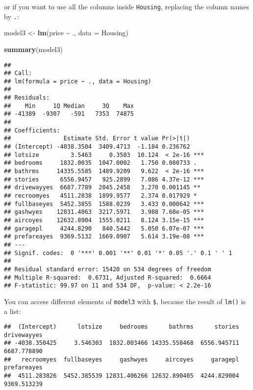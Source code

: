\documentclass[
]{article}
\newenvironment{Shaded}{\begin{snugshade}}{\end{snugshade}}
\newcommand{\DataTypeTok}[1]{\textcolor[rgb]{0.13,0.29,0.53}{#1}}
\newcommand{\KeywordTok}[1]{\textcolor[rgb]{0.13,0.29,0.53}{\textbf{#1}}}
\newcommand{\NormalTok}[1]{#1}
\newcommand{\OperatorTok}[1]{\textcolor[rgb]{0.81,0.36,0.00}{\textbf{#1}}}
\newcommand{\StringTok}[1]{\textcolor[rgb]{0.31,0.60,0.02}{#1}}
\begin{document}
or if you want to use all the columns inside \texttt{Housing}, replacing the column names by \texttt{.}:

\begin{Shaded}
\begin{Highlighting}[]
\NormalTok{model3 \textless{}{-}}\StringTok{ }\KeywordTok{lm}\NormalTok{(price }\OperatorTok{\textasciitilde{}}\StringTok{ }\NormalTok{., }\DataTypeTok{data =}\NormalTok{ Housing)}

\KeywordTok{summary}\NormalTok{(model3)}
\end{Highlighting}
\end{Shaded}

\begin{verbatim}
## 
## Call:
## lm(formula = price ~ ., data = Housing)
## 
## Residuals:
##    Min     1Q Median     3Q    Max 
## -41389  -9307   -591   7353  74875 
## 
## Coefficients:
##               Estimate Std. Error t value Pr(>|t|)    
## (Intercept) -4038.3504  3409.4713  -1.184 0.236762    
## lotsize         3.5463     0.3503  10.124  < 2e-16 ***
## bedrooms     1832.0035  1047.0002   1.750 0.080733 .  
## bathrms     14335.5585  1489.9209   9.622  < 2e-16 ***
## stories      6556.9457   925.2899   7.086 4.37e-12 ***
## drivewayyes  6687.7789  2045.2458   3.270 0.001145 ** 
## recroomyes   4511.2838  1899.9577   2.374 0.017929 *  
## fullbaseyes  5452.3855  1588.0239   3.433 0.000642 ***
## gashwyes    12831.4063  3217.5971   3.988 7.60e-05 ***
## aircoyes    12632.8904  1555.0211   8.124 3.15e-15 ***
## garagepl     4244.8290   840.5442   5.050 6.07e-07 ***
## prefareayes  9369.5132  1669.0907   5.614 3.19e-08 ***
## ---
## Signif. codes:  0 '***' 0.001 '**' 0.01 '*' 0.05 '.' 0.1 ' ' 1
## 
## Residual standard error: 15420 on 534 degrees of freedom
## Multiple R-squared:  0.6731, Adjusted R-squared:  0.6664 
## F-statistic: 99.97 on 11 and 534 DF,  p-value: < 2.2e-16
\end{verbatim}

You can access different elements of \texttt{model3} with \texttt{\$}, because the result of \texttt{lm()} is a list:

\begin{Shaded}
\end{Shaded}

\begin{verbatim}
##  (Intercept)      lotsize     bedrooms      bathrms      stories  drivewayyes 
## -4038.350425     3.546303  1832.003466 14335.558468  6556.945711  6687.778890 
##   recroomyes  fullbaseyes     gashwyes     aircoyes     garagepl  prefareayes 
##  4511.283826  5452.385539 12831.406266 12632.890405  4244.829004  9369.513239
\end{verbatim}
\end{document}
